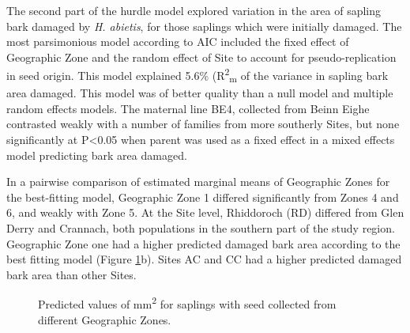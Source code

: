 \documentclass[a4paper, 11pt]{article}
\begin{document}
The second part of the hurdle model explored variation in the area of sapling bark damaged by \textit{H. abietis}, for those saplings which were initially damaged. The most parsimonious model according to AIC included the fixed effect of Geographic Zone and the random effect of Site to account for pseudo-replication in seed origin. This model explained 5.6\% (R\textsuperscript{2}\textsubscript{m} of the variance in sapling bark area damaged. This model was of better quality than a null model and multiple random effects models. The maternal line BE4, collected from Beinn Eighe contrasted weakly with a number of families from more southerly Sites, but none significantly at P\textless{}0.05 when parent was used as a fixed effect in a mixed effects model predicting bark area damaged.

In a pairwise comparison of estimated marginal means of Geographic Zones for the best-fitting model, Geographic Zone 1 differed significantly from Zones 4 and 6, and weakly with Zone 5. At the Site level, Rhiddoroch (RD) differed from Glen Derry and Crannach, both populations in the southern part of the study region. Geographic Zone one had a higher predicted damaged bark area according to the best fitting model (Figure \ref{pred_lmer}b). Sites AC and CC had a higher predicted damaged bark area than other Sites.

\begin{figure}[H]
\centering
	\caption{Predicted values of mm\textsuperscript{2} for saplings with seed collected from different Geographic Zones.}
	\label{pred_lmer}
\end{figure}
\end{document}

